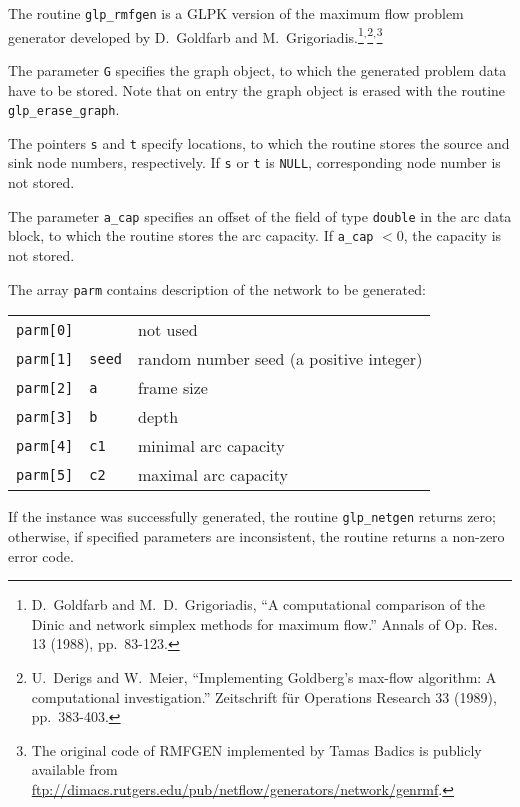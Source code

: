 \documentclass[11pt]{report}
\def\para#1{\noindent{\bf#1}}
\def\description{\para{Description}}
\def\returns{\para{Returns}}
\begin{document}
\description

The routine \verb|glp_rmfgen| is a GLPK version of the maximum flow
problem generator developed by D.~Goldfarb and
M.~Grigoriadis.\footnote{D.~Goldfarb and M.~D.~Grigoriadis,
``A computational comparison of the Dinic and network simplex methods
for maximum flow.'' Annals of Op. Res. 13 (1988),
pp.~83-123.}$^{,}$\footnote{U.~Derigs and W.~Meier, ``Implementing
Goldberg's max-flow algorithm: A computational investigation.''
Zeitschrift f\"ur Operations Research 33 (1989),
pp.~383-403.}$^{,}$\footnote{The original code of RMFGEN implemented by
Tamas Badics is publicly available from
\url{ftp://dimacs.rutgers.edu/pub/netflow/generators/network/genrmf}.}

The parameter \verb|G| specifies the graph object, to which the
generated problem data have to be stored. Note that on entry the graph
object is erased with the routine \verb|glp_erase_graph|.

The pointers \verb|s| and \verb|t| specify locations, to which the
routine stores the source and sink node numbers, respectively. If
\verb|s| or \verb|t| is \verb|NULL|, corresponding node number is not
stored.

The parameter \verb|a_cap| specifies an offset of the field of type
\verb|double| in the arc data block, to which the routine stores the
arc capacity. If \verb|a_cap| $<0$, the capacity is not stored.

\newpage

The array \verb|parm| contains description of the network to be
generated:

\begin{tabular}{@{}lll@{}}
\verb|parm[0]|&           &not used\\
\verb|parm[1]|&\verb|seed|&random number seed (a positive integer)\\
\verb|parm[2]|&\verb|a   |&frame size\\
\verb|parm[3]|&\verb|b   |&depth\\
\verb|parm[4]|&\verb|c1  |&minimal arc capacity\\
\verb|parm[5]|&\verb|c2  |&maximal arc capacity\\
\end{tabular}

\returns

If the instance was successfully generated, the routine
\verb|glp_netgen| returns zero; otherwise, if specified parameters are
inconsistent, the routine returns a non-zero error code.
\end{document}
